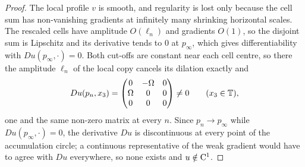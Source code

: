 \begin{proof}
  \leanok
  The local profile $v$ is smooth, and regularity is lost only because the
  cell sum has non-vanishing gradients at infinitely many shrinking horizontal
  scales.  The rescaled cells have amplitude $O(\ell_n)$ and gradients $O(1)$,
  so the disjoint sum is Lipschitz and its derivative tends to $0$ at
  $p_\infty$, which gives differentiability with $Du(p_\infty,\cdot)=0$.
  Both cut-offs are constant near each cell centre, so there the amplitude
  $\ell_n$ of the local copy cancels its dilation exactly and
  \[
    Du(p_n,x_3)=
    \begin{pmatrix}
      0      & -\Omega & 0 \\
      \Omega & 0       & 0 \\
      0      & 0       & 0
    \end{pmatrix}
    \neq0
    \qquad(x_3\in\mathbb{T}),
  \]
  one and the same non-zero matrix at every $n$.  Since $p_n\to p_\infty$ while
  $Du(p_\infty,\cdot)=0$, the derivative $Du$ is discontinuous at every point of the
  accumulation circle; a continuous representative of the weak gradient would have to agree
  with $Du$ everywhere, so none exists and $u\notin\mathrm{C}^1$.
\end{proof}

